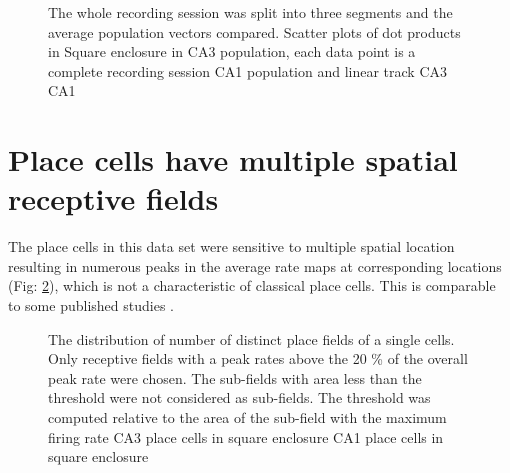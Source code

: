 \begin{figure}[htb!]
\centering
{}
\caption[Pooled CA3 population vectors]{The whole recording session was split into three segments and the average population vectors compared. Scatter plots of dot products in Square enclosure in  CA3 population, each data point is a complete recording session  CA1 population and linear track  CA3  CA1}
\label{fig:poolpvchunk}
\end{figure}


\section[Multiple Place fields]{Place cells have multiple spatial receptive fields}
\label{subfields}
The place cells in this data set were sensitive to multiple spatial location resulting in numerous peaks in the average rate maps at corresponding locations (Fig: \ref{fig:nsubfields}), which is not a characteristic of classical place cells. This is comparable to some published studies \cite{Fenton2008}.\\
\begin{figure}[htb!]
\centering
{}
\caption[Multiple receptive fields of Place Cells]{The distribution of number of distinct place fields of a single cells. Only receptive fields with a peak rates above the 20 \% of the overall peak rate were chosen. The sub-fields with area less than the threshold were not considered as sub-fields. The threshold was computed relative to the area of the sub-field with the maximum firing rate  CA3 place cells in square enclosure  CA1 place cells in square enclosure}
\label{fig:nsubfields}
\end{figure}

